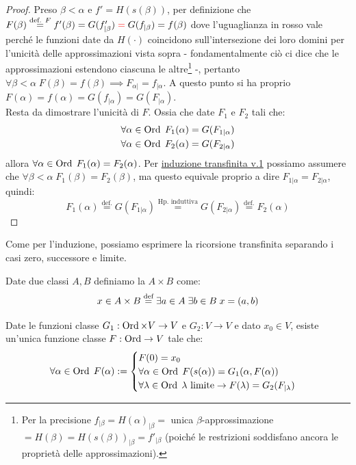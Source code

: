 \begin{proof}
	Preso $\beta < \alpha$ e $f' = H(s(\beta))$, per definizione che $F(\beta) \overset{\text{def. $F$}}{=} f'(\beta) = G(f'_{|\beta}) \;\textcolor{red}{=}\; G(f_{|\beta}) = f(\beta)$ dove l'uguaglianza in rosso vale perché le funzioni date da $H(\cdot)$ coincidono sull'intersezione dei loro domini per l'unicità delle approssimazioni vista sopra - fondamentalmente ciò ci 
	dice che le approssimazioni estendono ciascuna le altre\footnote{Per la precisione $f_{|\beta} = H(\alpha)_{|\beta} =$ unica $\beta$-approssimazione $= H(\beta) = H(s(\beta))_{|\beta} = f'_{|\beta}$ (poiché le restrizioni soddisfano ancora le proprietà delle approssimazioni).} -, pertanto $\forall \beta < \alpha \; F(\beta) = f(\beta) \implies F_{\alpha|} = f_{|\alpha}$. A questo punto si ha proprio $F(\alpha) = f(\alpha) = G(f_{|\alpha}) = G(F_{|\alpha})$.\\
	Resta da dimostrare l'unicità di $F$. Ossia che date $F_1$ e $F_2$ tali che:
	\begin{align*}
		&\forall \alpha \in \operatorname{Ord} \; F_1(\alpha) = G(F_{1|\alpha}) \\
		&\forall \alpha \in \operatorname{Ord} \; F_2(\alpha) = G(F_{2|\alpha})
	\end{align*}
	allora $\forall \alpha \in \operatorname{Ord} \; F_1(\alpha) = F_2(\alpha)$. Per \hyperref[induz_transf1]{induzione transfinita v.1} possiamo assumere che $\forall \beta < \alpha \; F_1(\beta) = F_2(\beta)$,
	ma questo equivale proprio a dire $F_{1|\alpha} = F_{2|\alpha}$, quindi:
	\[ F_1(\alpha) \overset{\text{def.}}{=} G(F_{1|\alpha}) \overset{\text{Hp. induttiva}}{=} G(F_{2|\alpha}) \overset{\text{def.}}{=} F_2(\alpha)
		\]
\end{proof}

Come per l'induzione, possiamo esprimere la ricorsione transfinita separando i casi zero, successore e limite.

\begin{definition}
	Date due classi $A,B$ definiamo la  $A \times B$ come:
	\[ x \in A \times B \overset{\text{def}}{=} \exists a \in A \; \exists b \in B \; x = (a,b)
		\]
\end{definition}

\begin{corollary}
	\label{ric_transf2}
	Date le funzioni classe $G_1 : \operatorname{Ord} \times V \rightarrow V$ e $G_2 : V \rightarrow V$ e dato $x_0 \in V$, esiste un'unica funzione classe $F : \operatorname{Ord} \to V$ tale che:
	\[ \forall \alpha \in \operatorname{Ord} \; F(\alpha) :=\begin{cases}
		F(0) = x_0 \\
		\forall \alpha \in \operatorname{Ord} \; F(s(\alpha)) = G_1(\alpha,F(\alpha)) \\
		\forall \lambda \in \operatorname{Ord} \; \text{$\lambda$ limite} \rightarrow F(\lambda) = G_2(F_{|\lambda})
	\end{cases}
		\]
\end{corollary}

